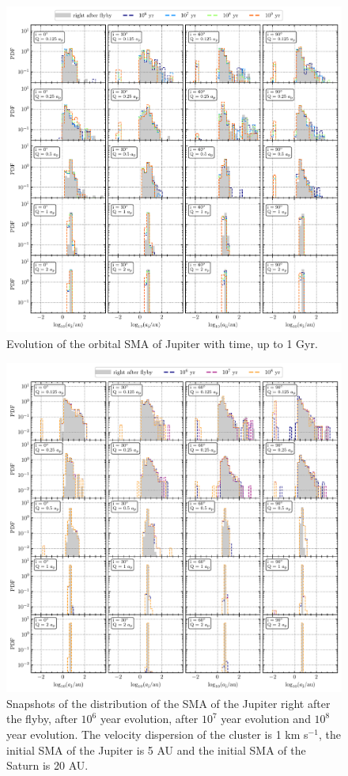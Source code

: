 \documentclass[twocolumn]{aastex63}
\begin{document}
\begin{figure}
    \includegraphics[width=\textwidth]{figs/convergence_check.pdf}
    \caption{Evolution of the orbital SMA of Jupiter with time, up to 1 Gyr.}
    \label{fig:convergence}
\end{figure}


\begin{figure}
    \includegraphics[width=\textwidth]{figs/HJ_aj-r4.pdf}
    \caption{Snapshots of the distribution of the SMA of the Jupiter right after the flyby, after $10^6$ year evolution, after $10^7$ year evolution and $10^8$ year evolution. The velocity dispersion of the cluster is 1 km s$^{-1}$, the initial SMA of the Jupiter is 5 AU and the initial SMA of the Saturn is {\color{red}20} AU. }
    \label{fig:hj-aj-s1-r4}
\end{figure}
\end{document}
